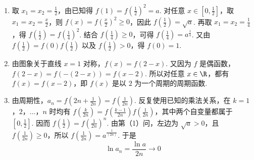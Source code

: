 \begin{solution}
\begin{enumerate}
\item 取 \(x_1=x_2=\frac12\)，由已知得 \(f(1)=f\left(\frac12\right)^2=a\). 对任意 \(x\in\left[0,\frac12\right]\)，取 \(x_1=x_2=\frac{x}{2}\)，则 \(f(x)=f\left(\frac{x}{2}\right)^2\geqslant0\)，因此 \(f\left(\frac12\right)=\sqrt a\). 再取 \(x_1=x_2=\frac14\)，得 \(f\left(\frac12\right)=f\left(\frac14\right)^2\). 结合 \(f\left(\frac14\right)\geqslant0\)，可得 \(f\left(\frac14\right)=a^{\frac{1}{4}}\). 又由 \(f\left(\frac12\right)=f(0)f\left(\frac12\right)\) 以及 \(f\left(\frac12\right)>0\)，得 \(f(0)=1\).
\item 由图象关于直线 \(x=1\) 对称，\(f(x)=f(2-x)\). 又因为 \(f\) 是偶函数，\(f(2-x)=f(-(2-x))=f(x-2)\). 所以对任意 \(x\in\R\)，都有 \(f(x)=f(x-2)\)，即 \(f(x)\) 是以 \(2\) 为一个周期的周期函数.
\item 由周期性，\(a_n=f\left(2n+\frac{1}{2n}\right)=f\left(\frac{1}{2n}\right)\). 反复使用已知的乘法关系，在 \(k=1\)，\(2\)，\(\ldots\)，\(n\) 时均有 \(f\left(\frac{k}{2n}\right)=f\left(\frac{k-1}{2n}\right)f\left(\frac{1}{2n}\right)\)，其中两个自变量都属于 \(\left[0,\frac12\right]\). 因而 \(f\left(\frac12\right)=f\left(\frac{1}{2n}\right)^n\). 由第（1）问，左边为 \(\sqrt a>0\)，且 \(f\left(\frac{1}{2n}\right)\geqslant0\)，所以 \(f\left(\frac{1}{2n}\right)=a^{\frac{1}{(2n)}}\). 于是
\[
\ln a_n=\frac{\ln a}{2n}\longrightarrow0
\]
\end{enumerate}
\end{solution}
